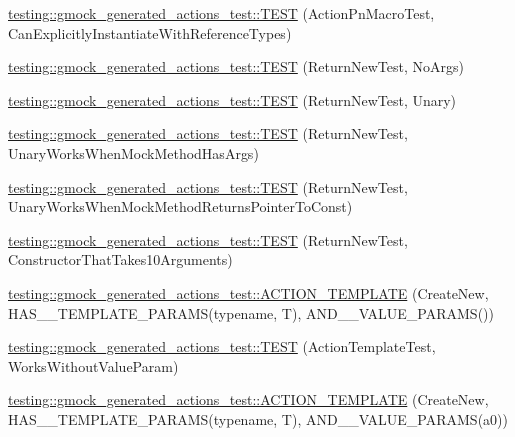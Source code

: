 \begin{DoxyCompactItemize}
\item 
\mbox{\hyperlink{namespacetesting_1_1gmock__generated__actions__test_a20664d32f08c53d6f9fa5e020a85fab3}{testing\+::gmock\+\_\+generated\+\_\+actions\+\_\+test\+::\+T\+E\+ST}} (Action\+Pn\+Macro\+Test, Can\+Explicitly\+Instantiate\+With\+Reference\+Types)
\item 
\mbox{\hyperlink{namespacetesting_1_1gmock__generated__actions__test_a058a3d17071ddb888319ab71b491af94}{testing\+::gmock\+\_\+generated\+\_\+actions\+\_\+test\+::\+T\+E\+ST}} (Return\+New\+Test, No\+Args)
\item 
\mbox{\hyperlink{namespacetesting_1_1gmock__generated__actions__test_a64f3f8327d51c139b441846e809ae4bc}{testing\+::gmock\+\_\+generated\+\_\+actions\+\_\+test\+::\+T\+E\+ST}} (Return\+New\+Test, Unary)
\item 
\mbox{\hyperlink{namespacetesting_1_1gmock__generated__actions__test_ad8f696b14b0f2dba4986c53f615aef15}{testing\+::gmock\+\_\+generated\+\_\+actions\+\_\+test\+::\+T\+E\+ST}} (Return\+New\+Test, Unary\+Works\+When\+Mock\+Method\+Has\+Args)
\item 
\mbox{\hyperlink{namespacetesting_1_1gmock__generated__actions__test_ad9f45ddc4a5616b919116c766ad37a30}{testing\+::gmock\+\_\+generated\+\_\+actions\+\_\+test\+::\+T\+E\+ST}} (Return\+New\+Test, Unary\+Works\+When\+Mock\+Method\+Returns\+Pointer\+To\+Const)
\item 
\mbox{\hyperlink{namespacetesting_1_1gmock__generated__actions__test_a1ed6392f4aeb68b9429ff7dd98ce5a86}{testing\+::gmock\+\_\+generated\+\_\+actions\+\_\+test\+::\+T\+E\+ST}} (Return\+New\+Test, Constructor\+That\+Takes10\+Arguments)
\item 
\mbox{\hyperlink{namespacetesting_1_1gmock__generated__actions__test_a1debc0726715951fcd7f5443e436dc46}{testing\+::gmock\+\_\+generated\+\_\+actions\+\_\+test\+::\+A\+C\+T\+I\+O\+N\+\_\+\+T\+E\+M\+P\+L\+A\+TE}} (Create\+New, H\+A\+S\+\_\+\_\+\+T\+E\+M\+P\+L\+A\+T\+E\+\_\+\+P\+A\+R\+A\+MS(typename, T), A\+N\+D\+\_\+\_\+\+V\+A\+L\+U\+E\+\_\+\+P\+A\+R\+A\+MS())
\item 
\mbox{\hyperlink{namespacetesting_1_1gmock__generated__actions__test_aaac879cbe00638dcc2d4733760180a4f}{testing\+::gmock\+\_\+generated\+\_\+actions\+\_\+test\+::\+T\+E\+ST}} (Action\+Template\+Test, Works\+Without\+Value\+Param)
\item 
\mbox{\hyperlink{namespacetesting_1_1gmock__generated__actions__test_a38fb8047f95126bb0b2cfe7e670c8af7}{testing\+::gmock\+\_\+generated\+\_\+actions\+\_\+test\+::\+A\+C\+T\+I\+O\+N\+\_\+\+T\+E\+M\+P\+L\+A\+TE}} (Create\+New, H\+A\+S\+\_\+\_\+\+T\+E\+M\+P\+L\+A\+T\+E\+\_\+\+P\+A\+R\+A\+MS(typename, T), A\+N\+D\+\_\+\_\+\+V\+A\+L\+U\+E\+\_\+\+P\+A\+R\+A\+MS(a0))

\end{DoxyCompactItemize}
